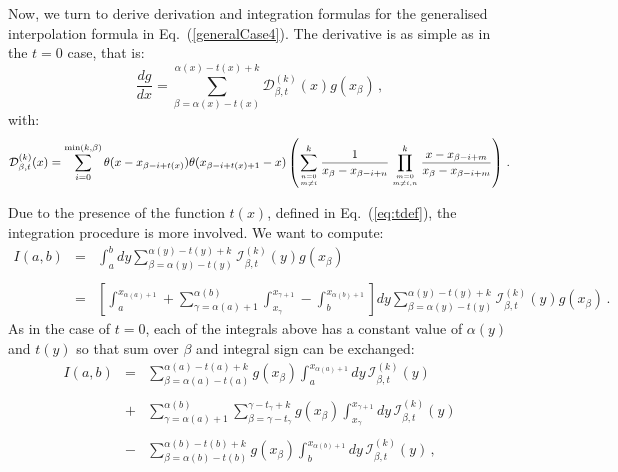 \documentclass[10pt,a4paper]{article}
\begin{document}
Now, we turn to derive derivation and integration formulas for the
generalised interpolation formula in Eq.~(\ref{generalCase4}). The
derivative is as simple as in the $t=0$ case, that is:
\begin{equation}\label{generalCase4}
\frac{dg}{dx} =
\sum_{\beta=\alpha(x)-t(x)}^{\alpha(x)-t(x)+k}\mathcal{D}_{\beta,t}^{(k)}(x) g(x_{\beta})\,,
\end{equation}
with:
\begin{equation}
\mathcal{D}_{\beta,t}^{(k)}(x) = \sum_{i=0}^{{\rm min}(k,\beta)}
\theta(x-x_{\beta-i+t(x)})\theta(x_{\beta-i+t(x)+1}-x) \left(\sum^{k}_{n=0\atop m\ne
i}\frac{1}{x_{\beta}-x_{\beta-i+n}}\prod^{k}_{m=0\atop m\ne
i,n}\frac{x-x_{\beta-i+m}}{x_{\beta}-x_{\beta-i+m}}\right)\,.
\end{equation}

Due to the presence of the function $t(x)$, defined in
Eq.~(\ref{eq:tdef}), the integration procedure is more involved. We
want to compute:
\begin{equation}
\begin{array}{rcl}
  I(a,b)&=&\displaystyle
  \int_a^b dy
  \sum_{\beta=\alpha(y)-t(y)}^{\alpha(y)-t(y)+k}\mathcal{I}_{\beta,t}^{(k)}(y)
  g(x_{\beta}) \\
\\
&=&\displaystyle \left[\int_a^{x_{\alpha(a)+1}}+ \sum_{\gamma=\alpha(a)+1}^{\alpha(b)}\int_{x_\gamma}^{x_{\gamma+1}}-\int_b^{x_{\alpha(b)+1}}\right]dy \sum_{\beta=\alpha(y) -t(y)}^{\alpha(y)-t(y)+k}\mathcal{I}_{\beta,t}^{(k)}(y)
  g(x_{\beta})\,.
\end{array}
\end{equation}
As in the case of $t=0$, each of the integrals above has a constant
value of $\alpha(y)$ and $t(y)$ so that sum over $\beta$ and integral
sign can be exchanged:
\begin{equation}\label{eq:integralT}
\begin{array}{rcl}
I(a,b) &=&\displaystyle  
\sum_{\beta=\alpha(a)
           -t(a)}^{\alpha(a)-t(a)+k}g(x_{\beta})\int_a^{x_{\alpha(a)+1}}dy\,\mathcal{I}_{\beta,t}^{(k)}(y)\\
\\
&+&\displaystyle
    \sum_{\gamma=\alpha(a)+1}^{\alpha(b)}\sum_{\beta=\gamma-t_\gamma}^{\gamma-t_\gamma+k}g(x_{\beta})\int_{x_\gamma}^{x_{\gamma+1}}dy\,\mathcal{I}_{\beta,t}^{(k)}(y)\\
\\
&-&\displaystyle \sum_{\beta=\alpha(b)-t(b)}^{\alpha(b)
    -t(b)+k}g(x_{\beta})\int_b^{x_{\alpha(b)+1}}dy\,\mathcal{I}_{\beta,t}^{(k)}(y)\,,
\end{array}
\end{equation}
\end{document}
